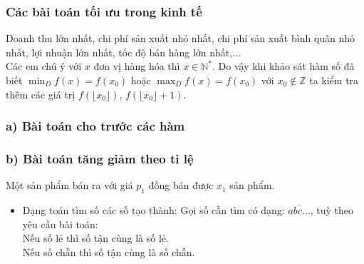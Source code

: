 \begin{khung}
	
	\subsubsection{Các bài toán tối ưu trong kinh tế} Doanh thu lớn nhất, chi phí sản xuất nhỏ nhất, chi phí sản xuất bình quân nhỏ nhất, lợi nhuận lớn nhất, tốc độ bán hàng lớn nhất,...\\
	Các em chú ý với $x$ đơn vị hàng hóa thì $x \in \mathbb{N}^*$. Do vậy khi khảo sát hàm số đã biết $\min_{D} f(x) = f(x_0)$ hoặc $\max_{D} f(x) = f(x_0)$ với $x_0 \notin \mathbb{Z}$ ta kiểm tra thêm các giá trị $f(\lfloor x_0 \rfloor)$, $f(\lfloor x_0 \rfloor + 1)$.
	\subsubsection*{a) Bài toán cho trước các hàm}
	
	\subsubsection*{b) Bài toán tăng giảm theo tỉ lệ}
	Một sản phẩm bán ra với giá $p_1$ đồng bán được $x_1$ sản phẩm.
	
	\begin{itemize}
		\item Dạng toán tìm số các số tạo thành: Gọi số cần tìm có dạng: $\overline{abc\ldots}$, tuỳ theo yêu cầu bài toán:\\
		Nếu số lẻ thì số tận cùng là số lẻ.\\
		Nếu số chẵn thì số tận cùng là số chẵn.
	\end{itemize}
\end{khung}